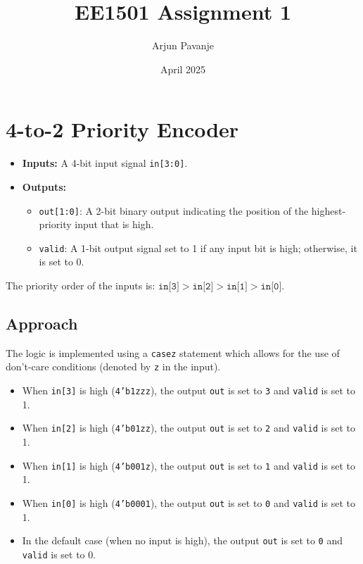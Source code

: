 \documentclass{article}
\title{EE1501 Assignment 1}
\author{Arjun Pavanje}
\date{April 2025}
\begin{document}
\maketitle
\section{4-to-2 Priority Encoder}
\begin{itemize}
    \item \textbf{Inputs:} A 4-bit input signal \texttt{in[3:0]}.
    \item \textbf{Outputs:}
    \begin{itemize}
        \item \texttt{out[1:0]}: A 2-bit binary output indicating the position of the highest-priority input that is high.
        \item \texttt{valid}: A 1-bit output signal set to 1 if any input bit is high; otherwise, it is set to 0.
    \end{itemize}
\end{itemize}
The priority order of the inputs is: $\texttt{in[3]} > \texttt{in[2]} > \texttt{in[1]} > \texttt{in[0]}$.\newline 
\subsection*{Approach} 
The logic is implemented using a \texttt{casez} statement which allows for the use of don't-care conditions (denoted by \texttt{z} in the input).
\begin{itemize}
    \item When \texttt{in[3]} is high (\texttt{4'b1zzz}), the output \texttt{out} is set to \texttt{3} and \texttt{valid} is set to 1.
    \item When \texttt{in[2]} is high (\texttt{4'b01zz}), the output \texttt{out} is set to \texttt{2} and \texttt{valid} is set to 1.
    \item When \texttt{in[1]} is high (\texttt{4'b001z}), the output \texttt{out} is set to \texttt{1} and \texttt{valid} is set to 1.
    \item When \texttt{in[0]} is high (\texttt{4'b0001}), the output \texttt{out} is set to \texttt{0} and \texttt{valid} is set to 1.
    \item In the default case (when no input is high), the output \texttt{out} is set to \texttt{0} and \texttt{valid} is set to 0.
\end{itemize}
\end{document}
